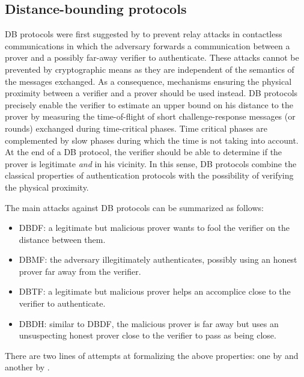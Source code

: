 \subsection{Distance-bounding protocols}%
\label{distance-bounding}

\Ac{DB} protocols were first suggested by \citet{DistanceBounding} to prevent relay attacks in contactless communications in which the adversary forwards a communication between a prover and a possibly far-away verifier to authenticate. 
These attacks cannot be prevented by cryptographic means as they are independent of the semantics of the messages exchanged.
As a consequence, mechanisms ensuring the physical proximity between a verifier and a prover should be used instead.
\Ac{DB} protocols precisely enable the verifier to estimate an upper bound on his distance to the prover by measuring the time-of-flight of short challenge-response messages (or rounds) exchanged during time-critical phases. 
Time critical phases are complemented by slow phases during which the time is not taking into account. 
At the end of a \Ac{DB} protocol, the verifier should be able to determine if 
the prover is legitimate \emph{and} in his vicinity.
In this sense, \Ac{DB} protocols combine the classical properties of authentication protocols with the possibility of verifying the physical proximity.

The main attacks against \ac{DB} protocols can be summarized as follows:
\begin{itemize}
  \item \Acf{DBDF}: a legitimate but malicious prover wants to fool the verifier on the distance between them.
  \item \Acf{DBMF}: the adversary illegitimately authenticates, possibly using an honest prover far away from the verifier.
  \item \Acf{DBTF}: a legitimate but malicious prover helps an accomplice close to the verifier to authenticate.
  \item \Acf{DBDH}: similar to \ac{DBDF}, the malicious prover is far away but 
    uses an unsuspecting honest prover close to the verifier to pass as being 
    close.
\end{itemize}
There are two lines of attempts at formalizing the above properties: one by 
\citet{DB-BMV} and another by \citet{DB-DFKO}.

